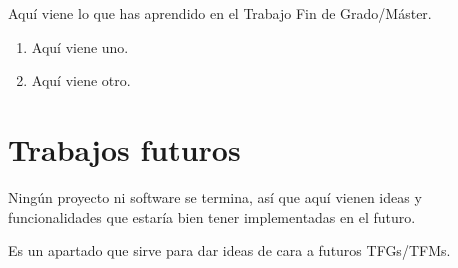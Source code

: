 Aquí viene lo que has aprendido en el Trabajo Fin de Grado/Máster.

\begin{enumerate}
  \item Aquí viene uno.
  \item Aquí viene otro.
\end{enumerate}


\section{Trabajos futuros}
\label{sec:trabajos_futuros}

Ningún proyecto ni software se termina, así que aquí vienen ideas y funcionalidades que estaría bien tener implementadas en el futuro.

Es un apartado que sirve para dar ideas de cara a futuros TFGs/TFMs.


